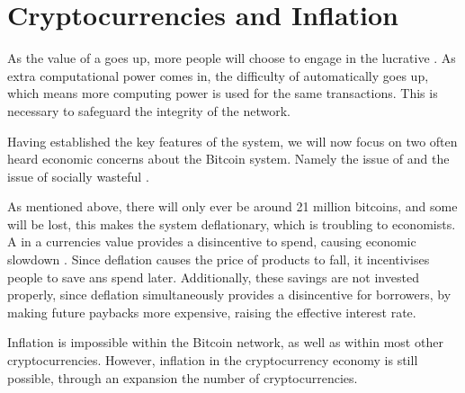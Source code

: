 
\chapter{Cryptocurrencies and Inflation}

As the value of a  goes up, more people
will choose to engage in the lucrative .
As extra computational power comes in, the difficulty of 
automatically goes up, which means more computing power is used for
the same transactions. This is necessary to safeguard the integrity
of the network.

Having established the key features of the 
system, we will now focus on two often heard economic concerns about
the Bitcoin system. Namely the issue of 
and the issue of socially wasteful .

As mentioned above, there will only ever be around 21 million bitcoins,
and some will be lost, this makes the system deflationary, which is
troubling to economists. A  in a currencies
value provides a disincentive to spend, causing economic slowdown
\citep[see e.g.][]{fisher1933debt}. Since deflation causes the price
of products to fall, it incentivises people to save ans spend later.
Additionally, these savings are not invested properly, since deflation
simultaneously provides a disincentive for borrowers, by making future
paybacks more expensive, raising the effective interest rate.

Inflation is impossible within the Bitcoin network, as well as within
most other cryptocurrencies. However, inflation in the cryptocurrency
economy is still possible, through an expansion the number of cryptocurrencies.
